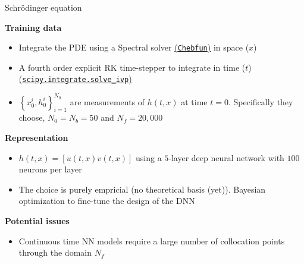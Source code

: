 \documentclass[xcolor=dvipsnames,10pt]{beamer}
\begin{document}
\begin{frame}[t]{Schr\"{o}dinger equation}
 
 {\bf Training data}
 \begin{itemize}
   \item<2-> Integrate the PDE using a Spectral solver \href{https://www.chebfun.org/}{(\texttt{Chebfun})} in space ($x$)
   \item<3-> A fourth order explicit RK time-stepper to integrate in time ($t$) \href{https://docs.scipy.org/doc/scipy/reference/generated/scipy.integrate.solve_ivp.html}{(\texttt{scipy.integrate.solve\_ivp})}
   \item<4-> $\left\{x_{0}^{i}, h_{0}^{i}\right\}_{i=1}^{N_{0}}$ are measurements of $h(t, x)$ at time $t=0$. Specifically they choose, $N_0 = N_b = 50$ and $N_f = 20,000$
 \end{itemize}

 \vspace*{1ex}
 {\bf Representation}
 \begin{itemize}
   \item<5-> $h(t, x)=[u(t, x) v(t, x)]$ using a $5$-layer deep neural network with $100$ neurons per layer
   \item<6-> The choice is purely empricial (no theoretical basis (yet)). Bayesian optimization to fine-tune the design of the DNN
 \end{itemize}

 \vspace*{1ex}
 {\bf Potential issues}
 \begin{itemize}
   \item<7-> Continuous time NN models require a large number of collocation points through the domain $N_f$
 \end{itemize}

\end{frame}
\end{document}
